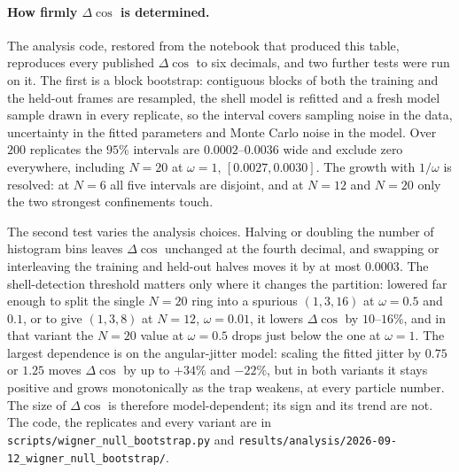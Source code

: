 \paragraph{How firmly $\Delta\cos$ is determined.}
The analysis code, restored from the notebook that produced this table, reproduces every
published $\Delta\cos$ to six decimals, and two further tests were run on it. The first is a
block bootstrap: contiguous blocks of both the training and the held-out frames are
resampled, the shell model is refitted and a fresh model sample drawn in every replicate, so
the interval covers sampling noise in the data, uncertainty in the fitted parameters and
Monte Carlo noise in the model. Over $200$ replicates the $95\%$ intervals are
$0.0002$--$0.0036$ wide and exclude zero everywhere, including $N{=}20$ at $\omega=1$,
$[0.0027,0.0030]$. The growth with $1/\omega$ is resolved: at $N{=}6$ all five intervals are
disjoint, and at $N{=}12$ and $N{=}20$ only the two strongest confinements touch.

The second test varies the analysis choices. Halving or doubling the number of histogram
bins leaves $\Delta\cos$ unchanged at the fourth decimal, and swapping or interleaving the
training and held-out halves moves it by at most $0.0003$. The shell-detection threshold
matters only where it changes the partition: lowered far enough to split the single $N{=}20$
ring into a spurious $(1,3,16)$ at $\omega=0.5$ and $0.1$, or to give $(1,3,8)$ at $N{=}12$,
$\omega=0.01$, it lowers $\Delta\cos$ by $10$--$16\%$, and in that variant the $N{=}20$
value at $\omega=0.5$ drops just below the one at $\omega=1$. The largest dependence is on the
angular-jitter model: scaling the fitted jitter by $0.75$ or $1.25$ moves $\Delta\cos$ by up
to $+34\%$ and $-22\%$, but in both variants it stays positive and grows monotonically as the
trap weakens, at every particle number. The size of $\Delta\cos$ is therefore
model-dependent; its sign and its trend are not. The code, the replicates and every variant
are in \texttt{scripts/wigner\_null\_bootstrap.py} and
\texttt{results/analysis/2026-09-12\_wigner\_null\_bootstrap/}.

